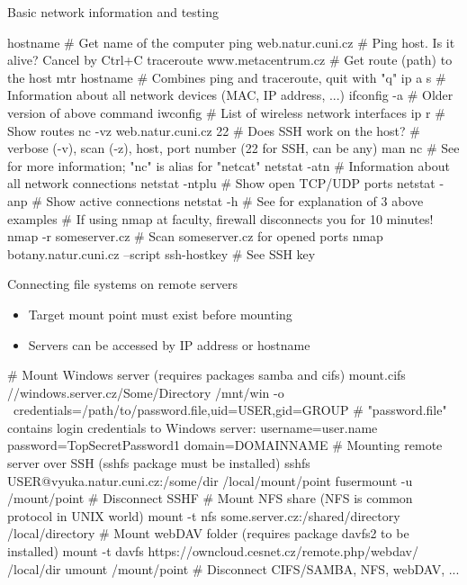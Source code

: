\documentclass[compress, ucs, xelatex, 11pt, xcolor=svgnames, aspectratio=169,
	hyperref={
		bookmarks=true,
		unicode=true,
		colorlinks=true,
		pdftitle={Linux, command line and MetaCentrum},
		plainpages=false,
		pdfauthor={Vojtech Zeisek},
		pdfsubject={Course about use of Linux command line, writing shell scripts and using MetaCentrum of CESNET},
		pdfcreator={XeLaTeX},
		pdfkeywords={Linux, GNU, BASH, shell, command line, MetaCentrum},
		linkcolor=DarkRed, %
		anchorcolor=DarkBlue, %
		citecolor=Indigo, %
		filecolor=NavyBlue, %
		menucolor=DarkMagenta, %
		urlcolor=DarkBlue, %
		pdftex},
	url={hyphens, lowtilde} %
	]{beamer}
\begin{document}
\begin{frame}[fragile]{Basic network information and testing}
	\begin{bashcode}
    hostname # Get name of the computer
    ping web.natur.cuni.cz # Ping host. Is it alive? Cancel by Ctrl+C
    traceroute www.metacentrum.cz # Get route (path) to the host
    mtr hostname # Combines ping and traceroute, quit with "q"
    ip a s # Information about all network devices (MAC, IP address, ...)
    ifconfig -a # Older version of above command
    iwconfig # List of wireless network interfaces
    ip r # Show routes
    nc -vz web.natur.cuni.cz 22 # Does SSH work on the host?
      # verbose (-v), scan (-z), host, port number (22 for SSH, can be any)
    man nc # See for more information; "nc" is alias for "netcat"
    netstat -atn # Information about all network connections
    netstat -ntplu # Show open TCP/UDP ports
    netstat -anp # Show active connections
    netstat -h # See for explanation of 3 above examples
    # If using nmap at faculty, firewall disconnects you for 10 minutes!
    nmap -r someserver.cz # Scan someserver.cz for opened ports
    nmap botany.natur.cuni.cz --script ssh-hostkey # See SSH key
	\end{bashcode}
\end{frame}

\begin{frame}[fragile]{Connecting file systems on remote servers}
	\label{netfs}
	\begin{itemize}
		\item Target mount point must exist before mounting
		\item Servers can be accessed by IP address or hostname
	\end{itemize}
	\vfill
	\begin{bashcode}
    # Mount Windows server (requires packages samba and cifs)
    mount.cifs //windows.server.cz/Some/Directory /mnt/win -o \
      credentials=/path/to/password.file,uid=USER,gid=GROUP
    # "password.file" contains login credentials to Windows server:
    username=user.name
    password=TopSecretPassword1
    domain=DOMAINNAME
    # Mounting remote server over SSH (sshfs package must be installed)
    sshfs USER@vyuka.natur.cuni.cz:/some/dir /local/mount/point
    fusermount -u /mount/point # Disconnect SSHF
    # Mount NFS share (NFS is common protocol in UNIX world)
    mount -t nfs some.server.cz:/shared/directory /local/directory
    # Mount webDAV folder (requires package davfs2 to be installed)
    mount -t davfs https://owncloud.cesnet.cz/remote.php/webdav/ /local/dir
    umount /mount/point # Disconnect CIFS/SAMBA, NFS, webDAV, ...
	\end{bashcode}
\end{frame}
\end{document}
